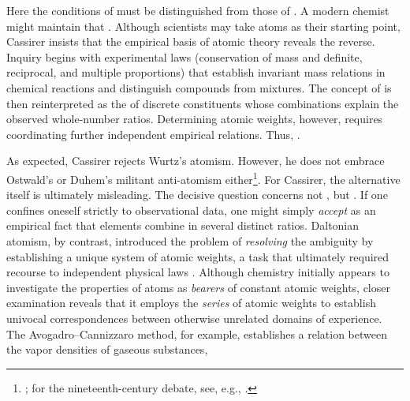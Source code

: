 \documentclass[submitted,12pt]{article}
\begin{document}
Here the conditions of  must be distinguished from those of  . A modern chemist might maintain that  . Although scientists may take atoms as their starting point, Cassirer insists that the empirical basis of atomic theory reveals the reverse. Inquiry begins with experimental laws (conservation of mass and definite, reciprocal, and multiple proportions) that establish invariant mass relations in chemical reactions and distinguish compounds from mixtures. The concept of  is then reinterpreted as the  of discrete constituents whose combinations explain the observed whole-number ratios. Determining atomic weights, however, requires coordinating further independent empirical relations. Thus,  .

As expected, Cassirer rejects Wurtz's  atomism. However, he does not embrace Ostwald's or Duhem's militant anti-atomism either\footnote{\citet{Needham2008}; for the nineteenth-century debate, see, e.g., \citet{Rocke1984}.}. For Cassirer, the alternative itself is ultimately misleading. The decisive question concerns not , but  . If one confines oneself strictly to observational data, one might simply \emph{accept} as an empirical fact that elements combine in several distinct ratios. Daltonian atomism, by contrast, introduced the problem of \emph{resolving} the ambiguity by establishing a unique system of atomic weights, a task that ultimately required recourse to independent physical laws \cite[see][lect.~IV]{Ladenburg1902}. Although chemistry initially appears to investigate the properties of atoms as \emph{bearers} of constant atomic weights, closer examination reveals that it employs the \emph{series} of atomic weights to establish univocal correspondences between otherwise unrelated domains of experience. The Avogadro--Cannizzaro method, for example, establishes a relation between the vapor densities of gaseous substances,
\end{document}
